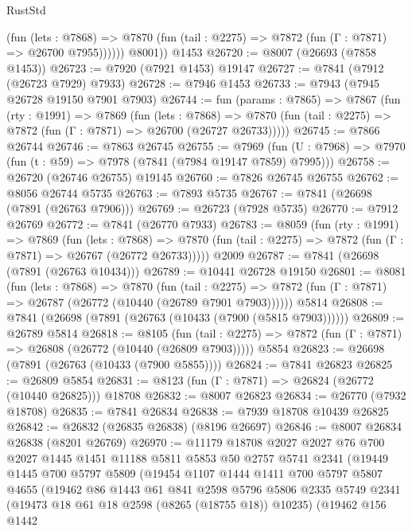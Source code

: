 \begin{lexlean}{RustStd}
\begin{coremodule}
{\begin{coremodule}
{{{{{{{{{{{{{{{{{{{{{{{{{{{{{{{{{{{{{{{{{{{{{{{{{{{{{{              (fun (lets : @7868) =>
              @7870 (fun (tail : @2275) => @7872 (fun (Γ : @7871) => @26700 @7955))))))
        @8001))
    @1453
@26720 := @8007 (@26693 (@7858 @1453))
@26723 := @7920 (@7921 @1453) @19147
@26727 := @7841 (@7912 (@26723 @7929) @7933)
@26728 := @7946 @1453
@26733 := @7943 (@7945 @26728 @19150 @7901 @7903)
@26744 := fun (params : @7865) =>
  @7867
    (fun (rty : @1991) =>
    @7869
      (fun (lets : @7868) =>
      @7870 (fun (tail : @2275) => @7872 (fun (Γ : @7871) => @26700 (@26727 @26733)))))
@26745 := @7866 @26744
@26746 := @7863 @26745
@26755 := @7969
    (fun (U : @7968) => @7970 (fun (t : @59) => @7978 (@7841 (@7984 @19147 @7859) @7995)))
@26758 := @26720 (@26746 @26755) @19145
@26760 := @7826 @26745 @26755
@26762 := @8056 @26744 @5735
@26763 := @7893 @5735
@26767 := @7841 (@26698 (@7891 (@26763 @7906)))
@26769 := @26723 (@7928 @5735)
@26770 := @7912 @26769
@26772 := @7841 (@26770 @7933)
@26783 := @8059
    (fun (rty : @1991) =>
    @7869
      (fun (lets : @7868) =>
      @7870 (fun (tail : @2275) => @7872 (fun (Γ : @7871) => @26767 (@26772 @26733)))))
    @2009
@26787 := @7841 (@26698 (@7891 (@26763 @10434)))
@26789 := @10441 @26728 @19150
@26801 := @8081
    (fun (lets : @7868) =>
    @7870
      (fun (tail : @2275) =>
      @7872 (fun (Γ : @7871) => @26787 (@26772 (@10440 (@26789 @7901 @7903))))))
    @5814
@26808 := @7841 (@26698 (@7891 (@26763 (@10433 (@7900 (@5815 @7903))))))
@26809 := @26789 @5814
@26818 := @8105
    (fun (tail : @2275) => @7872 (fun (Γ : @7871) => @26808 (@26772 (@10440 (@26809 @7903)))))
    @5854
@26823 := @26698 (@7891 (@26763 (@10433 (@7900 @5855))))
@26824 := @7841 @26823
@26825 := @26809 @5854
@26831 := @8123 (fun (Γ : @7871) => @26824 (@26772 (@10440 @26825))) @18708
@26832 := @8007 @26823
@26834 := @26770 (@7932 @18708)
@26835 := @7841 @26834
@26838 := @7939 @18708 @10439 @26825
@26842 := @26832 (@26835 @26838) (@8196 @26697)
@26846 := @8007 @26834 @26838 (@8201 @26769)
@26970 := @11179
    @18708
    @2027
    @2027
    @76
    @700
    @2027
    @1445
    @1451
    @11188
    @5811
    @5853
    @50
    @2757
    @5741
    @2341
    (@19449
      @1445
      @700
      @5797
      @5809
      (@19454
        @1107
        @1444
        @1411
        @700
        @5797
        @5807
        @4655
        (@19462
          @86
          @1443
          @61
          @841
          @2598
          @5796
          @5806
          @2335
          @5749
          @2341
          (@19473 @18 @61 @18 @2598 (@8265 (@18755 @18)) @10235)
          (@19462
            @156
            @1442
}}}}}}}}}}}}}}}}}}}}}}}}}}}}}}}}}}}}}}}}}}}}}}}}}}}}}}
\end{coremodule}}
\end{coremodule}
\end{lexlean}
